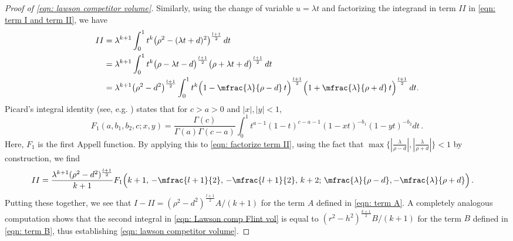 \documentclass[10pt,reqno]{amsart}
\numberwithin{equation}{section}
\theoremstyle{definition}
\begin{document}
{{\begin{proof}[Proof of \eqref{eqn: lawson competitor volume}]
Similarly, using the change of variable $u=\lambda t$ and factorizing the integrand in term $II$ in \eqref{eqn: term I and term II}, we have
\begin{align}\nonumber
    II 
    & = \lambda^{k+1} \int_0^1 t^k \big(\rho^2 - (\lambda t + d)^2 \big)^{\frac{l+1}{2}} \,dt \\
  \nonumber  & = \lambda^{k+1} \int_0^1 t^k \big(\rho - \lambda t - d\big)^{\frac{l+1}{2}} \big(\rho + \lambda t + d\big)^{\frac{l+1}{2}} \, dt \\
 \label{eqn: factorize term II}   & = \lambda^{k+1} \big(\rho^2 - d^2\big)^{\frac{l+1}{2}} \int_0^1 t^k \Big(1 - \mfrac{\lambda }{\rho -d}\, t \Big)^{\frac{l+1}{2}} \Big(1 + \mfrac{\lambda }{\rho +d} \, t \Big)^{\frac{ l + 1}{2}} \,dt.
\end{align}
Picard's integral identity (see, e.g. \cite[\S 5.8.2]{bateman_2023_cnd32-h9x80}) states that for $c>a>0$ and $|x|, |y|<1$, 
\begin{equation}
    \label{eqn: Picard identity}
F_1\left(a, b_1, b_2, c ; x, y\right)=\frac{\Gamma(c)}{\Gamma(a) \Gamma(c-a)} \int_0^1 t^{a-1}(1-t)^{c-a-1}(1-x t)^{-b_1}(1-y t)^{-b_2} d t\,.
\end{equation}
Here, $F_1$ is the first Appell function. By applying this to \eqref{eqn: factorize term II}, using the fact that $\max\{ |\frac{\lambda}{\rho -d}| , |\frac{\lambda}{\rho + d}|\} <1$   by construction,  we find
\begin{align*}
   II & = \frac{\lambda^{k+1} (\rho^2 - d^2)^{\frac{l+1}{2}}}{k+1} F_1 \Big(k+1 , \, -\mfrac{l+1}{2},\, -\mfrac{l+1}{2} , \, k+2; \,\mfrac{\lambda}{\rho- d} , -\mfrac{\lambda}{\rho +d}\Big) \,.
\end{align*}
Putting these together, we see that $ I - II  = {(\rho^2 - d^2)^{\frac{l+1}{2}}}A/(k+1)$  for the term $A$ defined in \eqref{eqn: term A}. A completely analogous computation shows that the second integral in \eqref{eqn: Lawson comp Flint vol} is equal to  $(r^2 - h^2)^{\frac{k+1}{2}}B/(k+1)$
for the term $B$ defined in \eqref{eqn: term B}, thus establishing \eqref{eqn: lawson competitor volume}. 
\end{proof}

}}
\end{document}
